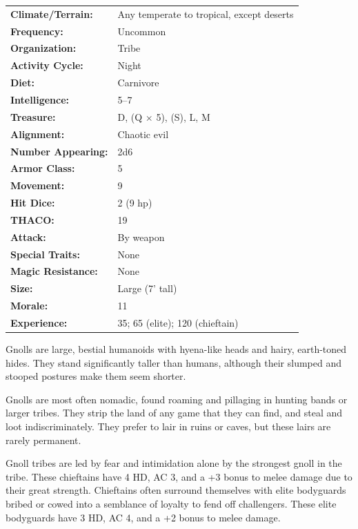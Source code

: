 \begin{multicols}{2}
\begin{minipage}{\columnwidth}
\noindent
\begin{tabular}{p{}p{}}
\textbf{Climate/Terrain:}	& Any temperate to tropical, except deserts \\
\textbf{Frequency:} 		& Uncommon \\
\textbf{Organization:} 		& Tribe \\
\textbf{Activity Cycle:} 	& Night \\
\textbf{Diet:} 				& Carnivore \\
\textbf{Intelligence:} 		& 5--7 \\
\textbf{Treasure:} 			& D, (Q $\times$ 5), (S), L, M \\
\textbf{Alignment:} 		& Chaotic evil \\
\hline
\textbf{Number Appearing:} 	& 2d6 \\
\textbf{Armor Class:} 		& 5 \\
\textbf{Movement:} 			& 9 \\
\textbf{Hit Dice:} 			& 2 (9 hp) \\
\textbf{THACO:} 			& 19 \\
\textbf{Attack:} 			& By weapon \\
\textbf{Special Traits:} & None \\
\textbf{Magic Resistance:} 	& None \\
\textbf{Size:} 				& Large (7' tall) \\
\textbf{Morale:} 			& 11 \\
\textbf{Experience:} 		& 35; 65 (elite); 120 (chieftain) \\ %
\end{tabular}

\end{minipage}

Gnolls are large, bestial humanoids with hyena-like heads and hairy, earth-toned hides. They stand significantly taller than humans, although their slumped and stooped postures make them seem shorter. 

Gnolls are most often nomadic, found roaming and pillaging in hunting bands or larger tribes. They strip the land of any game that they can find, and steal and loot indiscriminately. They prefer to lair in ruins or caves, but these lairs are rarely permanent.

Gnoll tribes are led by fear and intimidation alone by the strongest gnoll in the tribe. These chieftains have 4 HD, AC 3, and a +3 bonus to melee damage due to their great strength. Chieftains often surround themselves with elite bodyguards bribed or cowed into a semblance of loyalty to fend off challengers. These elite bodyguards have 3 HD, AC 4, and a +2 bonus to melee damage.


\end{multicols}
